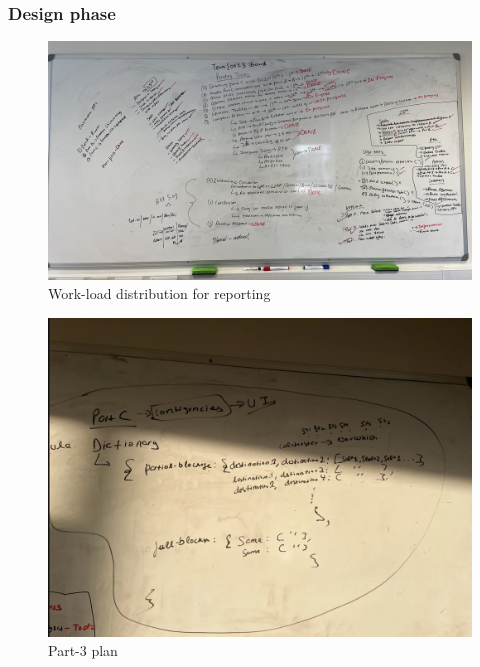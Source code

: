 \clearpage

\subsubsection{Design phase}
\begin{figure}[!htbp]
    \centering
    \includegraphics[width=1\linewidth]{Diagrams/Group_work/Group_whiteboard.jpg}
    \caption{Work-load distribution for reporting}
    \label{fig:lab2}
\end{figure}

\begin{figure} [!htbp]
    \centering
    \includegraphics[width=1\linewidth]{Diagrams/Group_work/lab_Handwritings.png}
    \caption{Part-3 plan}
    \label{fig:lab1}
\end{figure}

\clearpage
